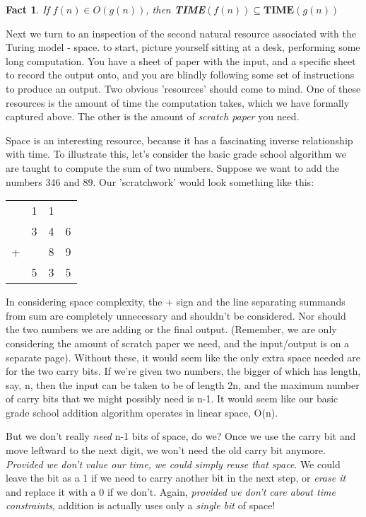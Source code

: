\documentclass{article}
\theoremstyle{definition}
\theoremstyle{plain}
\theoremstyle{theorem}
\newtheorem{fact}{Fact}[section]
\begin{document}
\begin{fact}
	If $f(n) \in O(g(n))$, then \textbf{TIME}$(f(n)) \subseteq \textbf{TIME}(g(n))$ 
\end{fact}
Next we turn to an inspection of the second natural resource associated with the Turing model - space. to start, picture yourself sitting at a desk, performing some long computation. You have a sheet of paper with the input, and a specific sheet to record the output onto, and you are blindly following some set of instructions to produce an output. Two obvious 'resources' should come to mind. One of these resources is the amount of time the computation takes, which we have formally captured above. The other is the amount of \textit{scratch paper} you need. 
\par Space is an interesting resource, because it has a fascinating inverse relationship with time. To illustrate this, let's consider the basic grade school algorithm we are taught to compute the sum of two numbers. Suppose we want to add the numbers 346 and 89. Our 'scratchwork' would look something like this:
\begin{center}
\begin{tabular}{c@{\,}c@{\,}c@{\,}c}
  & 1 & 1 &   \\
  & 3 & 4 & 6 \\
+ &   & 8 & 9 \\ 
\hline
  & 5 & 3 & 5 \\
\end{tabular}
\end{center}
\par In considering space complexity, the + sign and the line separating summands from sum are completely unnecessary and shouldn't be considered. Nor should the two numbers we are adding or the final output. (Remember, we are only considering the amount of scratch paper we need, and the input/output is on a separate page). Without these, it would seem like the only extra space needed are for the two carry bits. If we're given two numbers, the bigger of which has length, say, n, then the input can be taken to be of length 2n, and the maximum number of carry bits that we might possibly need is n-1. It would seem like our basic grade school addition algorithm operates in linear space, O(n).
\par But we don't really \textit{need} n-1 bits of space, do we? Once we use the carry bit and move leftward to the next digit, we won't need the old carry bit anymore. \textit{Provided we don't value our time, we could simply reuse that space}. We could leave the bit as a 1 if we need to carry another bit in the next step, or \textit{erase it} and replace it with a 0 if we don't. Again, \textit{provided we don't care about time constraints}, addition is actually uses only a \textit{single bit} of space!
\end{document}
